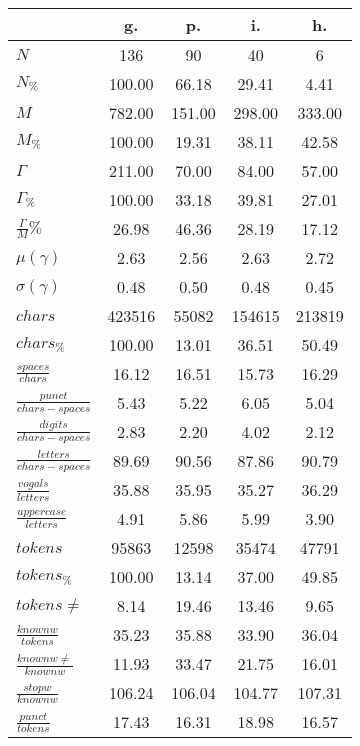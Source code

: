 \begin{table}[h!]
\begin{center}
\begin{tabular}{| l || c | c | c | c |}\hline
 & {\bf g.} & {\bf p.} & {\bf i.} & {\bf h.} \\\hline\hline
$N$ & 136  & 90  & 40  & 6 \\
$N_{\%}$ & 100.00  & 66.18  & 29.41  & 4.41 \\\hline
$M$ & 782.00  & 151.00  & 298.00  & 333.00 \\
$M_{\%}$ & 100.00  & 19.31  & 38.11  & 42.58 \\\hline
$\Gamma$ & 211.00  & 70.00  & 84.00  & 57.00 \\
$\Gamma_{\%}$ & 100.00  & 33.18  & 39.81  & 27.01 \\\hline
$\frac{\Gamma}{M}\%$ & 26.98  & 46.36  & 28.19  & 17.12 \\
$\mu(\gamma)$ & 2.63  & 2.56  & 2.63  & 2.72 \\
$\sigma(\gamma)$ & 0.48  & 0.50  & 0.48  & 0.45 \\\hline\hline
$chars$ & 423516  & 55082  & 154615  & 213819 \\
$chars_{\%}$ & 100.00  & 13.01  & 36.51  & 50.49 \\\hline
$\frac{spaces}{chars}$ & 16.12  & 16.51  & 15.73  & 16.29 \\
$\frac{punct}{chars-spaces}$ & 5.43  & 5.22  & 6.05  & 5.04 \\
$\frac{digits}{chars-spaces}$ & 2.83  & 2.20  & 4.02  & 2.12 \\\hline
$\frac{letters}{chars-spaces}$ & 89.69  & 90.56  & 87.86  & 90.79 \\
$\frac{vogals}{letters}$ & 35.88  & 35.95  & 35.27  & 36.29 \\
$\frac{uppercase}{letters}$ & 4.91  & 5.86  & 5.99  & 3.90 \\\hline\hline
$tokens$ & 95863  & 12598  & 35474  & 47791 \\
$tokens_{\%}$ & 100.00  & 13.14  & 37.00  & 49.85 \\
$tokens \neq$ & 8.14  & 19.46  & 13.46  & 9.65 \\\hline
$\frac{knownw}{tokens}$ & 35.23  & 35.88  & 33.90  & 36.04 \\
$\frac{knownw \neq}{knownw}$ & 11.93  & 33.47  & 21.75  & 16.01 \\\hline
$\frac{stopw}{knownw}$ & 106.24  & 106.04  & 104.77  & 107.31 \\
$\frac{punct}{tokens}$ & 17.43  & 16.31  & 18.98  & 16.57 \\

\end{tabular}
\end{center}
\end{table}

